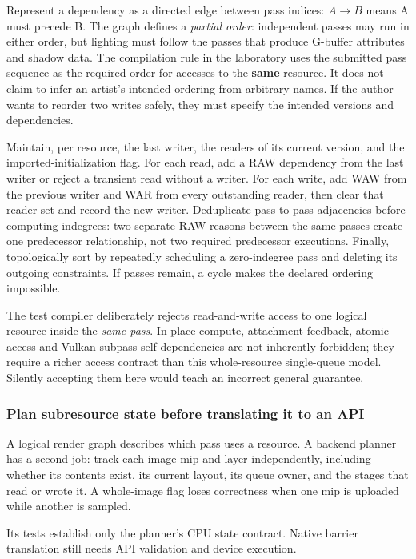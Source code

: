 Represent a dependency as a directed edge between pass indices: \(A\to B\) means A must precede B. The graph defines a \emph{partial order}: independent passes may run in either order, but lighting must follow the passes that produce G-buffer attributes and shadow data. The compilation rule in the laboratory uses the submitted pass sequence as the required order for accesses to the \textbf{same} resource. It does not claim to infer an artist's intended ordering from arbitrary names. If the author wants to reorder two writes safely, they must specify the intended versions and dependencies.

Maintain, per resource, the last writer, the readers of its current version, and the imported-initialization flag. For each read, add a RAW dependency from the last writer or reject a transient read without a writer. For each write, add WAW from the previous writer and WAR from every outstanding reader, then clear that reader set and record the new writer. Deduplicate pass-to-pass adjacencies before computing indegrees: two separate RAW reasons between the same passes create one predecessor relationship, not two required predecessor executions. Finally, topologically sort by repeatedly scheduling a zero-indegree pass and deleting its outgoing constraints. If passes remain, a cycle makes the declared ordering impossible.

The test compiler deliberately rejects read-and-write access to one logical resource inside the \emph{same pass}. In-place compute, attachment feedback, atomic access and Vulkan subpass self-dependencies are not inherently forbidden; they require a richer access contract than this whole-resource single-queue model. Silently accepting them here would teach an incorrect general guarantee.

\subsubsection{Plan subresource state before translating it to an API}\label{plan-subresource-state-before-translating-it-to-an-api}

A logical render graph describes which pass uses a resource. A backend planner has a second job: track each image mip and layer independently, including whether its contents exist, its current layout, its queue owner, and the stages that read or wrote it. A whole-image flag loses correctness when one mip is uploaded while another is sampled.

Its tests establish only the planner's CPU state contract. Native barrier translation still needs API validation and device execution.

